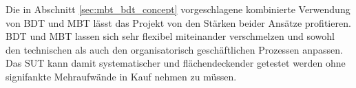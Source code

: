 Die in Abschnitt \ref{sec:mbt_bdt_concept} vorgeschlagene kombinierte Verwendung von \Gls{BDT} und \Gls{MBT} lässt das Projekt von den Stärken beider Ansätze profitieren. \Gls{BDT} und \Gls{MBT} lassen sich sehr flexibel miteinander verschmelzen und sowohl den technischen als auch den organisatorisch geschäftlichen Prozessen anpassen. Das \Gls{SUT} kann damit systematischer und flächendeckender getestet werden ohne signifankte Mehraufwände in Kauf nehmen zu müssen.

